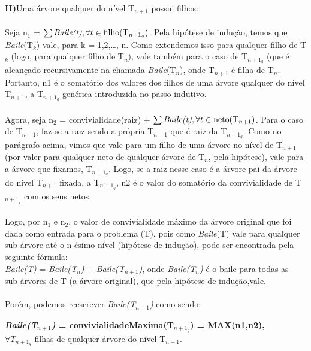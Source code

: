 \documentclass[a4paper]{article}
\begin{document}
\textbf{II)}Uma árvore qualquer do nível T$_{n+1}$ possui filhos:
\paragraph{}Seja n$_1$ = $\sum \text{\emph{Baile(t)}}, \forall t \in \text{filho(T$_{n+1_q}$)}$. Pela hipótese de indução, temos que \emph{Baile}(T$_k$) vale, para k = 1,2,\ldots, n. Como extendemos isso para qualquer filho de T$_k$ (logo, para qualquer filho de T$_n$), vale também para o caso de T$_{n+1_q}$ (que é alcançado recursivamente na chamada \emph{Baile}(T$_n$), onde T$_{n+1}$ é filha de T$_n$.  Portanto, n1 é o somatório dos valores dos filhos de uma árvore qualquer do nível T$_{n+1}$, a T$_{n+1_q}$ genérica introduzida no passo indutivo.

\paragraph{}Agora, seja n$_2$ = convivialidade(raiz) + $\sum \text{\emph{Baile(t)}}, \forall t \in \text{neto(T$_{n+1}$)}$. Para o caso de T$_{n+1}$, faz-se a raiz sendo a própria T$_{n+1}$ que é raiz da T$_{n+1_q}$. Como no parágrafo acima, vimos que vale para um filho de uma árvore no nível de T$_{n+1}$ (por valer para qualquer neto de qualquer árvore de T$_{n}$, pela hipótese), vale para a árvore que fixamos, T$_{n+1_q}$. Logo, se a raiz nesse caso é a árvore pai da árvore do nível T$_{n+1}$ fixada, a T$_{n+1_q}$, n2 é o valor do somatório da convivialidade de T$_{n+1_q}$ com os seus netos.\\
 
\paragraph{}Logo, por n$_1$ e n$_2$, o valor de convivialidade máximo da árvore original que foi dada como entrada para o problema (T), pois como \emph{Baile}(T) vale para qualquer sub-árvore até o n-ésimo nível (hipótese de indução), pode ser encontrada pela seguinte fórmula:\\
\emph{Baile(T)} = \emph{Baile(T$_n$)} + \emph{Baile(T$_{n+1}$)}, onde \emph{Baile(T$_n$)} é o baile para todas as sub-árvores de T (a árvore original), que pela hipótese de indução,vale.\\
\paragraph{}Porém, podemos reescrever \emph{Baile(T$_{n+1}$)} como sendo:
\begin{center} 
\textbf{\emph{Baile(T$_{n+1}$)} = convivialidadeMaxima(T$_{n+1_q}$) =  MAX(n1,n2),} \\$\forall T_{n+1_q}$ filhas de qualquer árvore do nível T$_{n+1}$.
\end{center}
\end{document}
